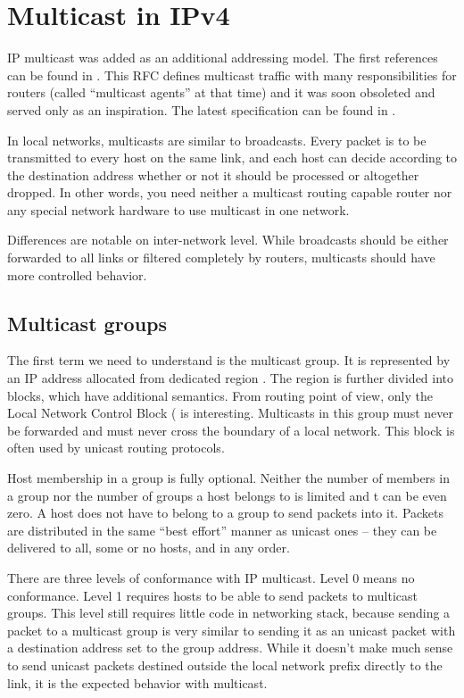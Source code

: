 \chapter{Multicast in IPv4}

IP multicast was added as an additional addressing model. The first
references can be found in . This RFC defines multicast traffic
with many responsibilities for routers (called ``multicast agents'' at that time)
and it was soon obsoleted and served only as an inspiration. The latest
specification can be found in .

In local networks, multicasts are similar to broadcasts. Every packet is to be
transmitted to every host on the same link, and each host can decide according to
the destination address whether or not it should be processed or altogether
dropped. In other words, you need neither a multicast routing capable router
nor any special network hardware to use multicast in one network.

Differences are notable on inter-network level. While broadcasts should be
either forwarded to all links or filtered completely by routers, multicasts
should have more controlled behavior.

\section{Multicast groups}

The first term we need to understand is the multicast group. It is represented by an IP
address allocated from dedicated region . The region is further
divided into blocks, which have additional semantics. From routing point of
view, only the Local Network Control Block ( is
interesting. Multicasts in this group must never be forwarded and must never
cross the boundary of a local network. This block is often used by unicast
routing protocols.

Host membership in a group is fully optional. Neither the number of members in
a group nor the number of groups a host belongs to is limited and t can be even
zero. A host does not have to belong to a group to send packets into it.
Packets are distributed in the same ``best effort'' manner as unicast ones -- they can
be delivered to all, some or no hosts, and in any order.

There are three levels of conformance with IP multicast. Level 0 means no
conformance. Level 1 requires hosts to be able to send packets to multicast
groups. This level still requires little code in networking stack, because
sending a packet to a multicast group is very similar to sending it as an unicast
packet with a destination address set to the group address. While it doesn't make much
sense to send unicast packets destined outside the local network prefix directly
to the link, it is the expected behavior with multicast.

